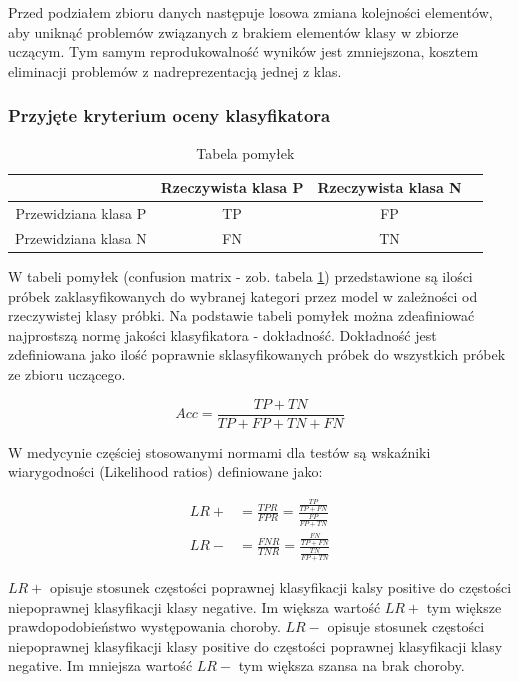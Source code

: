 \documentclass{article}
\begin{document}
Przed podziałem zbioru danych następuje losowa zmiana kolejności elementów, aby uniknąć problemów związanych z brakiem elementów klasy w zbiorze uczącym. Tym samym reprodukowalność wyników jest zmniejszona, kosztem eliminacji problemów z nadreprezentacją jednej z klas.

\subsubsection{Przyjęte kryterium oceny klasyfikatora}

\begin{table}
\caption{Tabela pomyłek}
\label{conf matrix}
\centering
\begin{tabular}{|c|c|c|c|}
  \hline 
   & Rzeczywista klasa P & Rzeczywista klasa N \\
  \hline
  Przewidziana klasa P & TP & FP \\
  \hline
  Przewidziana klasa N & FN & TN \\
  \hline
\end{tabular}
\end{table}

W tabeli pomyłek (confusion matrix - zob. tabela \ref{conf matrix}) przedstawione są ilości próbek zaklasyfikowanych do wybranej kategori przez model w zależności od rzeczywistej klasy próbki. Na podstawie tabeli pomyłek można zdeafiniować najprostszą normę jakości klasyfikatora - dokładność. Dokładność jest zdefiniowana jako ilość poprawnie sklasyfikowanych próbek do wszystkich próbek ze zbioru uczącego.

\begin{equation}
	Acc = \frac{TP+TN}{TP+FP+TN+FN}
\end{equation}

W medycynie częściej stosowanymi normami dla testów są wskaźniki wiarygodności (Likelihood ratios) definiowane jako:

\begin{equation}
\begin{aligned}
	LR+ &= \frac{TPR}{FPR} = \frac{\frac{TP}{TP+FN}}{\frac{FP}{FP+TN}} \\ 
	LR- &= \frac{FNR}{TNR} = \frac{\frac{FN}{TP+FN}}{\frac{TN}{FP+TN}}
\end{aligned}
\end{equation}

$LR+$ opisuje stosunek częstości poprawnej klasyfikacji kalsy positive do częstości niepoprawnej klasyfikacji klasy negative. Im większa wartość $LR+$ tym większe prawdopodobieństwo występowania choroby.
$LR-$ opisuje stosunek częstości niepoprawnej klasyfikacji klasy positive do częstości poprawnej klasyfikacji klasy negative. Im mniejsza wartość $LR-$ tym większa szansa na brak choroby.
\end{document}
